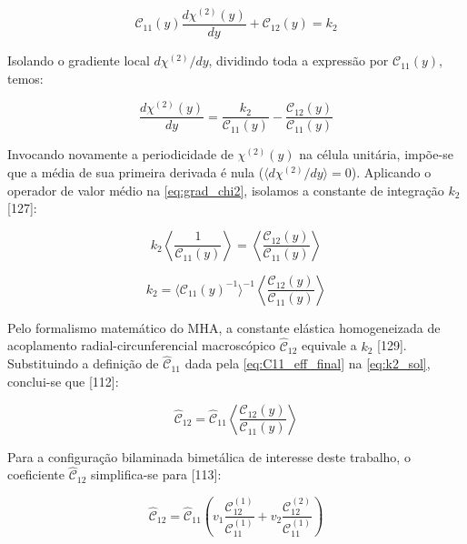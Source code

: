 \begin{equation}
  \mathcal{C}_{11}(y) \frac{d \chi^{(2)}(y)}{d y} + \mathcal{C}_{12}(y) = k_2
  \label{eq:integ_chi2_1}
\end{equation}

Isolando o gradiente local $d \chi^{(2)} / d y$, dividindo toda a expressão por $\mathcal{C}_{11}(y)$, temos:

\begin{equation}
  \frac{d \chi^{(2)}(y)}{d y} = \frac{k_2}{\mathcal{C}_{11}(y)} - \frac{\mathcal{C}_{12}(y)}{\mathcal{C}_{11}(y)}
  \label{eq:grad_chi2}
\end{equation}

Invocando novamente a periodicidade de $\chi^{(2)}(y)$ na célula unitária, impõe-se que a média de sua primeira derivada é nula ($\langle d \chi^{(2)} / d y \rangle = 0$). Aplicando o operador de valor médio na \eqref{eq:grad_chi2}, isolamos a constante de integração $k_2$ [127]:

\begin{equation}
  k_2 \left\langle \frac{1}{\mathcal{C}_{11}(y)} \right\rangle = \left\langle \frac{\mathcal{C}_{12}(y)}{\mathcal{C}_{11}(y)} \right\rangle
  \label{eq:k2_solve_pre}
\end{equation}

\begin{equation}
  k_2 = \langle \mathcal{C}_{11}(y)^{-1} \rangle^{-1} \left\langle \frac{\mathcal{C}_{12}(y)}{\mathcal{C}_{11}(y)} \right\rangle
  \label{eq:k2_sol}
\end{equation}

Pelo formalismo matemático do MHA, a constante elástica homogeneizada de acoplamento radial-circunferencial macroscópico $\hat{\mathcal{C}}_{12}$ equivale a $k_2$ [129]. Substituindo a definição de $\hat{\mathcal{C}}_{11}$ dada pela \eqref{eq:C11_eff_final} na \eqref{eq:k2_sol}, conclui-se que [112]:

\begin{equation}
  \hat{\mathcal{C}}_{12} = \hat{\mathcal{C}}_{11} \left\langle \frac{\mathcal{C}_{12}(y)}{\mathcal{C}_{11}(y)} \right\rangle
  \label{eq:Chat12_Calculation}
\end{equation}

Para a configuração bilaminada bimetálica de interesse deste trabalho, o coeficiente $\hat{\mathcal{C}}_{12}$ simplifica-se para [113]:

\begin{equation}
  \hat{\mathcal{C}}_{12} = \hat{\mathcal{C}}_{11} \left( v_1 \frac{\mathcal{C}_{12}^{(1)}}{\mathcal{C}_{11}^{(1)}} + v_2 \frac{\mathcal{C}_{12}^{(2)}}{\mathcal{C}_{11}^{(1)}} \right)
  \label{eq:C12_bilaminado}
\end{equation}

